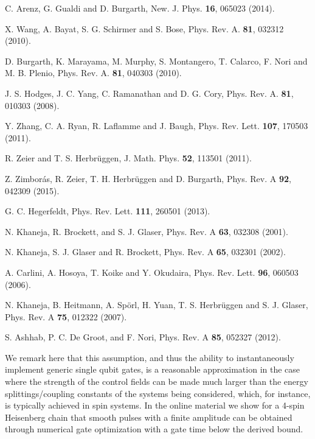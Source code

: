 \documentclass[aps,twocolumn,amsmath,amssymb,nofootinbib,superscriptaddress]{revtex4-1}
\begin{document}
\begin{thebibliography}{99}
 C. Arenz, G. Gualdi and D. Burgarth, New. J. Phys. \textbf{16}, 065023 (2014).


 X. Wang, A. Bayat, S. G. Schirmer and S. Bose, Phys. Rev. A. \textbf{81}, 032312 (2010).

 D. Burgarth, K. Marayama, M. Murphy, S. Montangero, T. Calarco, F. Nori and M. B. Plenio, Phys. Rev. A. \textbf{81},  040303 (2010).


 J. S. Hodges, J. C. Yang, C. Ramanathan and D. G. Cory, Phys. Rev. A. \textbf{81}, 010303 (2008).

 Y. Zhang, C. A. Ryan, R. Laflamme and J. Baugh, Phys. Rev. Lett. \textbf{107}, 170503 (2011).

 R. Zeier and T. S. Herbr\"uggen, J. Math. Phys. \textbf{52}, 113501 (2011). 

 Z. Zimbor\'{a}s, R. Zeier, T. H. Herbr\"uggen and D. Burgarth, Phys. Rev. A \textbf{92}, 042309 (2015).




 G. C. Hegerfeldt, Phys. Rev. Lett. \textbf{111}, 260501 (2013).

 N. Khaneja, R. Brockett, and S. J. Glaser, Phys. Rev. A \textbf{63}, 032308 (2001). 

 N. Khaneja, S. J. Glaser and R. Brockett, Phys. Rev. A \textbf{65}, 032301 (2002). 



 A. Carlini, A. Hosoya, T. Koike and Y. Okudaira, Phys. Rev. Lett. \textbf{96}, 060503 (2006).

 N. Khaneja, B. Heitmann, A. Sp\"orl, H. Yuan, T. S. Herbr\"uggen and S. J. Glaser, Phys. Rev. A \textbf{75}, 012322 (2007). 

 S. Ashhab, P. C. De Groot, and F. Nori, Phys. Rev. A \textbf{85}, 052327 (2012).


We remark here that this assumption, and thus the ability to instantaneously implement generic single qubit gates, is a reasonable approximation in the case where the strength of the control fields can be made much larger than the energy splittings/coupling constants of the systems being considered, which, for instance, is typically achieved in spin systems. In the online material we show for a 4-spin Heisenberg chain that smooth pulses with a finite amplitude can be obtained through numerical gate optimization with a gate time below the derived bound.






\end{thebibliography}
\end{document}
